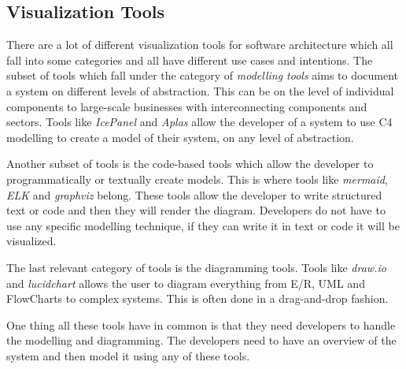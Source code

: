 \subsection{Visualization Tools}
There are a lot of different visualization tools for software architecture which all fall into some categories and all have different use cases and intentions.
The subset of tools which fall under the category of \textit{modelling tools} aims to document a system on different levels of abstraction. This can be on the level of individual components to large-scale businesses with interconnecting components and sectors.
Tools like \textit{IcePanel} and \textit{Aplas} allow the developer of a system to use C4 modelling to create a model of their system, on any level of abstraction.

Another subset of tools is the code-based tools which allow the developer to programmatically or textually create models. This is where tools like \textit{mermaid}, \textit{ELK} and \textit{graphviz} belong.
These tools allow the developer to write structured text or code and then they will render the diagram. Developers do not have to use any specific modelling technique, if they can write it in text or code it will be visualized.

The last relevant category of tools is the diagramming tools. Tools like \textit{draw.io} and \textit{lucidchart} allows the user to diagram everything from E/R, UML and FlowCharts to complex systems.
This is often done in a drag-and-drop fashion.

One thing all these tools have in common is that they need developers to handle the modelling and diagramming. The developers need to have an overview of the system and then model it using any of these tools.
